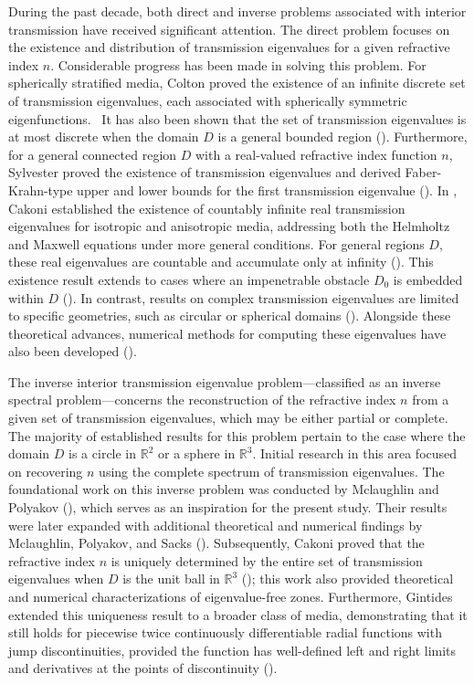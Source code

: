 \documentclass[11pt,reqno]{amsart}
\theoremstyle{definition}
\theoremstyle{remark}
\numberwithin{equation}{section}
\begin{document}
During the past decade, both direct and inverse problems associated with interior transmission have received significant attention. The direct problem focuses on the existence and distribution of transmission eigenvalues for a given refractive index $n$. Considerable progress has been made in solving this problem. For spherically stratified media, Colton proved the existence of an infinite discrete set of transmission eigenvalues, each associated with spherically symmetric eigenfunctions.~ It has also been shown that the set of transmission eigenvalues is at most discrete when the domain $D$ is a general bounded region (\cite{CKP89,RS91}). Furthermore, for a general connected region $D$ with a real-valued refractive index function $n$, Sylvester proved the existence of transmission eigenvalues and derived Faber-Krahn-type upper and lower bounds for the first transmission eigenvalue (\cite{PS08}). In \cite{CGH10}, Cakoni established the existence of countably infinite real transmission eigenvalues for isotropic and anisotropic media, addressing both the Helmholtz and Maxwell equations under more general conditions. For general regions $D$, these real eigenvalues are countable and accumulate only at infinity (\cite{CCH16}). This existence result extends to cases where an impenetrable obstacle $D_0$ is embedded within $D$ (\cite{CCH12}). In contrast, results on complex transmission eigenvalues are limited to specific geometries, such as circular or spherical domains (\cite{CL13,CL17,CLM15,LC12}). Alongside these theoretical advances, numerical methods for computing these eigenvalues have also been developed (\cite{AS15, CMS14, GJSX16, LHLL15}).

The inverse interior transmission eigenvalue problem---classified as an inverse spectral problem---concerns the reconstruction of the refractive index $n$ from a given set of transmission eigenvalues, which may be either partial or complete. The majority of established results for this problem pertain to the case where the domain $D$ is a circle in $\mathbb{R}^2$ or a sphere in $\mathbb{R}^3$. Initial research in this area focused on recovering $n$ using the complete spectrum of transmission eigenvalues. The foundational work on this inverse problem was conducted by Mclaughlin and Polyakov (\cite{MP94}), which serves as an inspiration for the present study. Their results were later expanded with additional theoretical and numerical findings by Mclaughlin, Polyakov, and Sacks (\cite{MPS94}). Subsequently, Cakoni proved that the refractive index $n$ is uniquely determined by the entire set of transmission eigenvalues when $D$ is the unit ball in $\mathbb{R}^3$ (\cite{CCG10}); this work also provided theoretical and numerical characterizations of eigenvalue-free zones. Furthermore, Gintides extended this uniqueness result to a broader class of media, demonstrating that it still holds for piecewise twice continuously differentiable radial functions with jump discontinuities, provided the function has well-defined left and right limits and derivatives at the points of discontinuity (\cite{GP17}).
\end{document}

